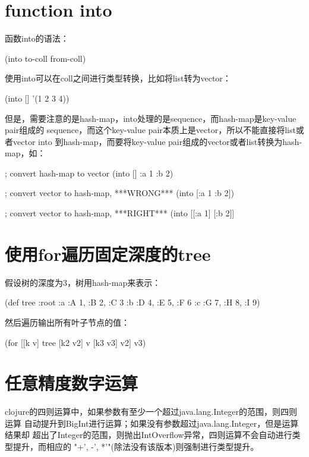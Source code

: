 \documentclass[a4paper,11pt]{article}
\begin{document}
  \section[function into]{function into}
  函数into的语法：\par
  \begin{schemecode}
    (into to-coll from-coll)
  \end{schemecode}

  使用into可以在coll之间进行类型转换，比如将list转为vector：\par
  \begin{schemecode}
    (into [] '(1 2 3 4))
  \end{schemecode}

  但是，需要注意的是hash-map，into处理的是sequence，而hash-map是key-value pair组成的
  sequence，而这个key-value pair本质上是vector，所以不能直接将list或者vector into
  到hash-map，而要将key-value pair组成的vector或者list转换为hash-map，如：\par
  \begin{schemecode}
    ; convert hash-map to vector
    (into [] {:a 1 :b 2})
    
    ; convert vector to hash-map, ***WRONG***
    (into {} [:a 1 :b 2])

    ; convert vector to hash-map, ***RIGHT***
    (into {} [[:a 1] [:b 2]]
  \end{schemecode}

  \section[使用for遍历固定深度的tree]{使用for遍历固定深度的tree}
  假设树的深度为3，树用hash-map来表示：\par
  \begin{schemecode}
    (def tree
      {:root
        {:a
          {:A 1, :B 2, :C 3}
         :b
          {:D 4, :E 5, :F 6}
         :c
          {:G 7, :H 8, :I 9}}})
  \end{schemecode}

  然后遍历输出所有叶子节点的值：\par
  \begin{schemecode}
    (for [[k v] tree
          [k2 v2] v
          [k3 v3] v2]
      v3)    
  \end{schemecode}

  \section[任意精度数字运算]{任意精度数字运算}
  clojure的四则运算中，如果参数有至少一个超过java.lang.Integer的范围，则四则运算
  自动提升到BigInt进行运算；如果没有参数超过java.lang.Integer，但是运算结果却
  超出了Integer的范围，则抛出IntOverflow异常，四则运算不会自动进行类型提升，而相应的
  "+', -', *'"(除法没有该版本)则强制进行类型提升。
\end{document}
